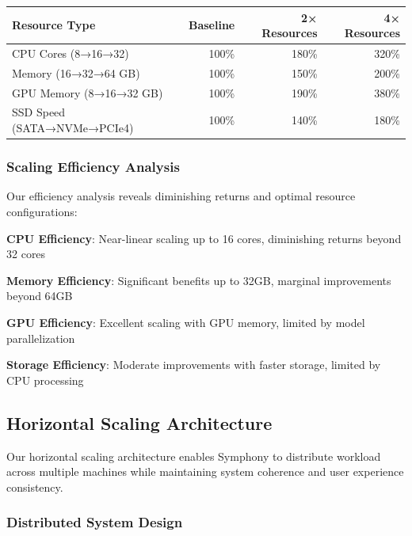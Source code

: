 \begin{center}
\begin{tabular}{@{}lrrr@{}}
\toprule
\textbf{Resource Type} & \textbf{Baseline} & \textbf{2× Resources} & \textbf{4× Resources} \\
\midrule
CPU Cores (8→16→32) & 100\% & 180\% & 320\% \\
Memory (16→32→64 GB) & 100\% & 150\% & 200\% \\
GPU Memory (8→16→32 GB) & 100\% & 190\% & 380\% \\
SSD Speed (SATA→NVMe→PCIe4) & 100\% & 140\% & 180\% \\
\bottomrule
\end{tabular}
\end{center}

\subsubsection*{Scaling Efficiency Analysis}

Our efficiency analysis reveals diminishing returns and optimal resource configurations:

\begin{compactlist}
    \item \textbf{CPU Efficiency}: Near-linear scaling up to 16 cores, diminishing returns beyond 32 cores
    \item \textbf{Memory Efficiency}: Significant benefits up to 32GB, marginal improvements beyond 64GB
    \item \textbf{GPU Efficiency}: Excellent scaling with GPU memory, limited by model parallelization
    \item \textbf{Storage Efficiency}: Moderate improvements with faster storage, limited by CPU processing
\end{compactlist}

\subsection*{Horizontal Scaling Architecture}

Our horizontal scaling architecture enables Symphony to distribute workload across multiple machines while maintaining system coherence and user experience consistency.

\subsubsection*{Distributed System Design}

